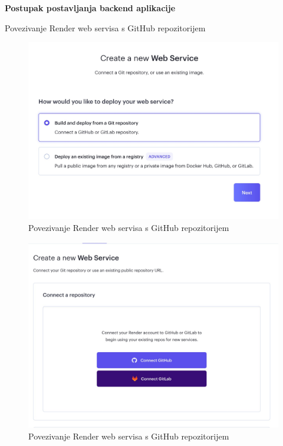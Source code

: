 \textbf{Postupak postavljanja backend aplikacije}

\begin{packed_item}
        \item Povezivanje Render web servisa s GitHub repozitorijem \\
        
      \begin{figure}[H]
			\includegraphics[width=\textwidth]{slike/Backend1.JPG} %
			\caption{Povezivanje Render web servisa s GitHub repozitorijem}
			\label{fig:backend1} %
		\end{figure}

\begin{figure}[H]
			\includegraphics[width=\textwidth]{slike/Backend2.JPG} %
			\caption{Povezivanje Render web servisa s GitHub repozitorijem}
			\label{fig:backend2} %
		\end{figure}
        

\end{packed_item}
